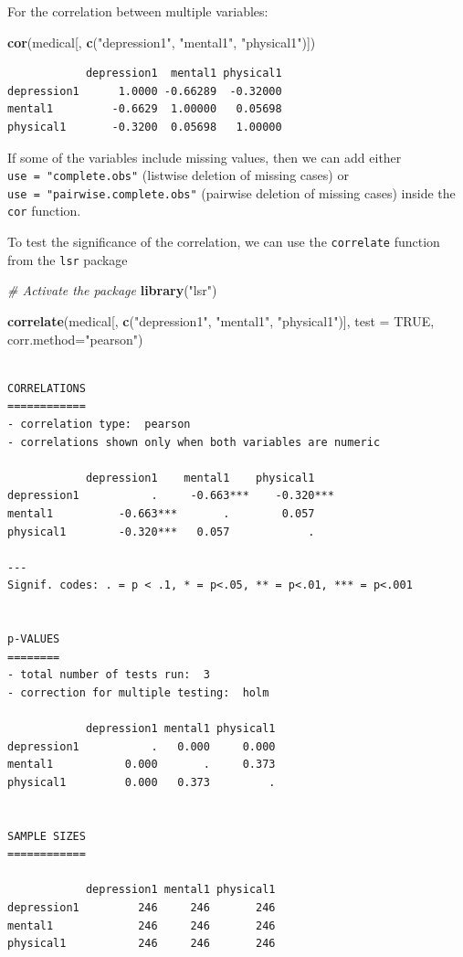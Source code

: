 \documentclass[]{book}
\newenvironment{Shaded}{\begin{snugshade}}{\end{snugshade}}
\newcommand{\CommentTok}[1]{\textcolor[rgb]{0.56,0.35,0.01}{\textit{#1}}}
\newcommand{\DataTypeTok}[1]{\textcolor[rgb]{0.13,0.29,0.53}{#1}}
\newcommand{\KeywordTok}[1]{\textcolor[rgb]{0.13,0.29,0.53}{\textbf{#1}}}
\newcommand{\NormalTok}[1]{#1}
\newcommand{\OtherTok}[1]{\textcolor[rgb]{0.56,0.35,0.01}{#1}}
\newcommand{\StringTok}[1]{\textcolor[rgb]{0.31,0.60,0.02}{#1}}
\begin{document}
For the correlation between multiple variables:

\begin{Shaded}
\begin{Highlighting}[]
\KeywordTok{cor}\NormalTok{(medical[, }\KeywordTok{c}\NormalTok{(}\StringTok{"depression1"}\NormalTok{, }\StringTok{"mental1"}\NormalTok{, }\StringTok{"physical1"}\NormalTok{)])}
\end{Highlighting}
\end{Shaded}

\begin{verbatim}
            depression1  mental1 physical1
depression1      1.0000 -0.66289  -0.32000
mental1         -0.6629  1.00000   0.05698
physical1       -0.3200  0.05698   1.00000
\end{verbatim}

If some of the variables include missing values, then we can add either \texttt{use\ =\ "complete.obs"} (listwise deletion of missing cases) or \texttt{use\ =\ "pairwise.complete.obs"} (pairwise deletion of missing cases) inside the \texttt{cor} function.

To test the significance of the correlation, we can use the \texttt{correlate} function from the \texttt{lsr} package

\begin{Shaded}
\begin{Highlighting}[]
\CommentTok{# Activate the package}
\KeywordTok{library}\NormalTok{(}\StringTok{"lsr"}\NormalTok{)}

\KeywordTok{correlate}\NormalTok{(medical[, }\KeywordTok{c}\NormalTok{(}\StringTok{"depression1"}\NormalTok{, }\StringTok{"mental1"}\NormalTok{, }\StringTok{"physical1"}\NormalTok{)], }
          \DataTypeTok{test =} \OtherTok{TRUE}\NormalTok{, }\DataTypeTok{corr.method=}\StringTok{"pearson"}\NormalTok{)}
\end{Highlighting}
\end{Shaded}

\begin{verbatim}

CORRELATIONS
============
- correlation type:  pearson 
- correlations shown only when both variables are numeric

            depression1    mental1    physical1   
depression1           .     -0.663***    -0.320***
mental1          -0.663***       .        0.057   
physical1        -0.320***   0.057            .   

---
Signif. codes: . = p < .1, * = p<.05, ** = p<.01, *** = p<.001


p-VALUES
========
- total number of tests run:  3 
- correction for multiple testing:  holm 

            depression1 mental1 physical1
depression1           .   0.000     0.000
mental1           0.000       .     0.373
physical1         0.000   0.373         .


SAMPLE SIZES
============

            depression1 mental1 physical1
depression1         246     246       246
mental1             246     246       246
physical1           246     246       246
\end{verbatim}
\end{document}
